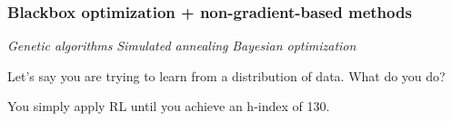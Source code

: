 \subsubsection{Blackbox optimization + non-gradient-based methods}

\textit{Genetic algorithms}
\textit{Simulated annealing}
\textit{Bayesian optimization}



\begin{question}
\label{q:1}
Let's say you are trying to learn from a distribution of data. What do you do?

\end{question}

\begin{solution}
\label{sol:1}
You simply apply RL until you achieve an h-index of 130. 

\end{solution}



\newpage